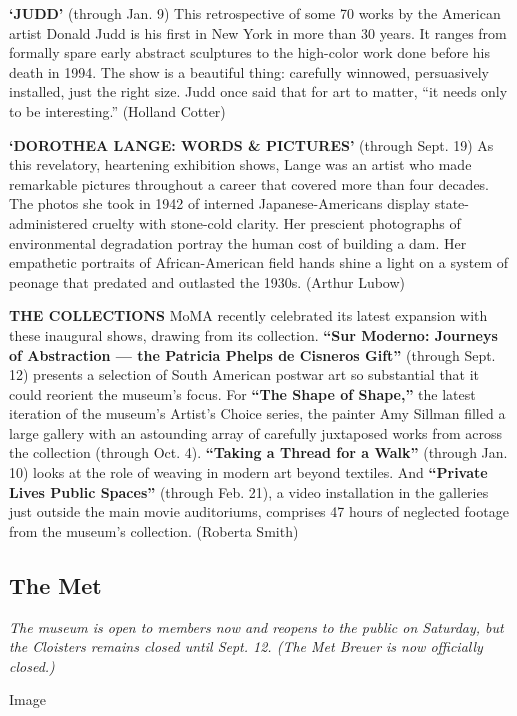\textbf{`JUDD'} (through Jan. 9) This retrospective of some 70 works by
the American artist Donald Judd is his first in New York in more than 30
years. It ranges from formally spare early abstract sculptures to the
high-color work done before his death in 1994. The show is a beautiful
thing: carefully winnowed, persuasively installed, just the right size.
Judd once said that for art to matter, ``it needs only to be
interesting.'' (Holland Cotter)

\textbf{`DOROTHEA LANGE: WORDS \& PICTURES'} (through Sept. 19) As this
revelatory, heartening exhibition shows, Lange was an artist who made
remarkable pictures throughout a career that covered more than four
decades. The photos she took in 1942 of interned Japanese-Americans
display state-administered cruelty with stone-cold clarity. Her
prescient photographs of environmental degradation portray the human
cost of building a dam. Her empathetic portraits of African-American
field hands shine a light on a system of peonage that predated and
outlasted the 1930s. (Arthur Lubow)

\textbf{THE COLLECTIONS} MoMA recently celebrated its latest expansion
with these inaugural shows, drawing from its collection. \textbf{``Sur
Moderno: Journeys of Abstraction --- the Patricia Phelps de Cisneros
Gift''} (through Sept. 12) presents a selection of South American
postwar art so substantial that it could reorient the museum's focus.
For \textbf{``The Shape of Shape,''} the latest iteration of the
museum's Artist's Choice series, the painter Amy Sillman filled a large
gallery with an astounding array of carefully juxtaposed works from
across the collection (through Oct. 4). \textbf{``Taking a Thread for a
Walk''} (through Jan. 10) looks at the role of weaving in modern art
beyond textiles. And \textbf{``Private Lives Public Spaces''} (through
Feb. 21), a video installation in the galleries just outside the main
movie auditoriums, comprises 47 hours of neglected footage from the
museum's collection. (Roberta Smith)

\hypertarget{the-met}{%
\subsection{The Met}\label{the-met}}

\emph{The museum is open to members now and reopens to the public on
Saturday, but the Cloisters remains closed until Sept. 12. (The Met
Breuer is now officially closed.)}

Image

